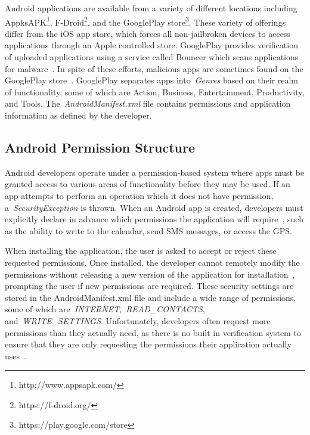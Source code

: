 \documentclass[conference]{IEEEtran}
\begin{document}
Android applications are available from a variety of different locations including AppksAPK\footnote{http://www.appsapk.com/}, F-Droid\footnote{https://f-droid.org/}, and the GooglePlay store\footnote{https://play.google.com/store}. These variety of offerings differ from the iOS app store, which forces all non-jailbroken devices to access applications through an Apple controlled store. GooglePlay provides verification of uploaded applications using a service called Bouncer which scans applications for malware~\cite{bouncer_url1}. In spite of these efforts, malicious apps are sometimes found on the GooglePlay store~\cite{Zhou:2012:DAM:2310656.2310710}. GooglePlay separates apps into~\emph{Genres} based on their realm of functionality, some of which are Action, Business, Entertainment, Productivity, and Tools. The~\emph{AndroidManifest.xml} file contains permissions and application information as defined by the developer.



\subsection{Android Permission Structure}
Android developers operate under a permission-based system where apps must be granted access to various areas of functionality before they may be used. If an app attempts to perform an operation which it does not have permission, a~\emph{SecurityException} is thrown. When an Android app is created, developers must explicitly declare in advance which permissions the application will require~\cite{Felt:2011:APD:2046707.2046779}, such as the ability to write to the calendar, send SMS messages, or access the GPS.

When installing the application, the user is asked to accept or reject these requested permissions. Once installed, the developer cannot remotely modify the permissions without releasing a new version of the application for installation~\cite{shaerpour2013trends}, prompting the user if new permissions are required. These security settings are stored in the AndroidManifest.xml file and include a wide range of permissions, some of which are~\emph{INTERNET},~\emph{READ\_CONTACTS}, and~\emph{WRITE\_SETTINGS}. Unfortunately, developers often request more permissions than they actually need, as there is no built in verification system to ensure that they are only requesting the permissions their application actually uses~\cite{Felt:2011:APD:2046707.2046779}.
\end{document}
